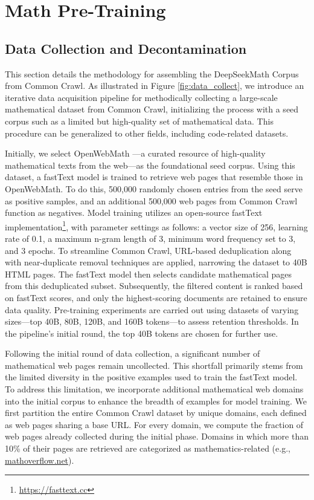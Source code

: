 \section{Math Pre-Training}

\subsection{Data Collection and Decontamination} 

This section details the methodology for assembling the DeepSeekMath Corpus from Common Crawl. As illustrated in Figure \ref{fig:data_collect}, we introduce an iterative data acquisition pipeline for methodically collecting a large-scale mathematical dataset from Common Crawl, initializing the process with a seed corpus such as a limited but high-quality set of mathematical data. This procedure can be generalized to other fields, including code-related datasets.

Initially, we select OpenWebMath \citep{openwebmath}—a curated resource of high-quality mathematical texts from the web—as the foundational seed corpus. Using this dataset, a fastText model \citep{joulin2016fasttext} is trained to retrieve web pages that resemble those in OpenWebMath. To do this, 500,000 randomly chosen entries from the seed serve as positive samples, and an additional 500,000 web pages from Common Crawl function as negatives. Model training utilizes an open-source fastText implementation\footnote{\url{https://fasttext.cc}}, with parameter settings as follows: a vector size of 256, learning rate of 0.1, a maximum n-gram length of 3, minimum word frequency set to 3, and 3 epochs. To streamline Common Crawl, URL-based deduplication along with near-duplicate removal techniques are applied, narrowing the dataset to 40B HTML pages. The fastText model then selects candidate mathematical pages from this deduplicated subset. Subsequently, the filtered content is ranked based on fastText scores, and only the highest-scoring documents are retained to ensure data quality. Pre-training experiments are carried out using datasets of varying sizes—top 40B, 80B, 120B, and 160B tokens—to assess retention thresholds. In the pipeline’s initial round, the top 40B tokens are chosen for further use.

Following the initial round of data collection, a significant number of mathematical web pages remain uncollected. This shortfall primarily stems from the limited diversity in the positive examples used to train the fastText model. To address this limitation, we incorporate additional mathematical web domains into the initial corpus to enhance the breadth of examples for model training. We first partition the entire Common Crawl dataset by unique domains, each defined as web pages sharing a base URL. For every domain, we compute the fraction of web pages already collected during the initial phase. Domains in which more than 10\% of their pages are retrieved are categorized as mathematics-related (e.g., \url{mathoverflow.net}). 

